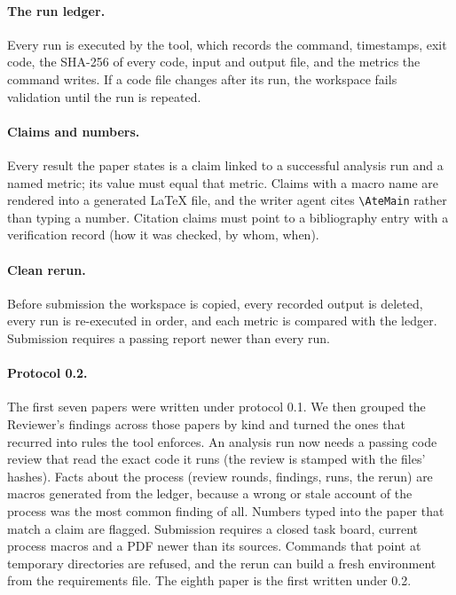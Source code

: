 \documentclass[11pt]{article}
\begin{document}
\paragraph{The run ledger.} Every run is executed by the tool, which records the
command, timestamps, exit code, the SHA-256 of every code, input and output file, and
the metrics the command writes. If a code file changes after its run, the workspace
fails validation until the run is repeated.

\paragraph{Claims and numbers.} Every result the paper states is a claim linked to a
successful analysis run and a named metric; its value must equal that metric. Claims
with a macro name are rendered into a generated \LaTeX{} file, and the writer agent
cites \verb|\AteMain| rather than typing a number. Citation claims must point to a
bibliography entry with a verification record (how it was checked, by whom, when).

\paragraph{Clean rerun.} Before submission the workspace is copied, every recorded
output is deleted, every run is re-executed in order, and each metric is compared with
the ledger. Submission requires a passing report newer than every run.

\paragraph{Protocol 0.2.} The first seven papers were written under protocol 0.1. We then
grouped the Reviewer's findings across those papers by kind and turned the ones that
recurred into rules the tool enforces. An analysis run now needs a passing code review
that read the exact code it runs (the review is stamped with the files' hashes). Facts
about the process (review rounds, findings, runs, the rerun) are macros generated from
the ledger, because a wrong or stale account of the process was the most common finding
of all. Numbers typed into the paper that match a claim are flagged. Submission requires
a closed task board, current process macros and a PDF newer than its sources. Commands
that point at temporary directories are refused, and the rerun can build a fresh
environment from the requirements file. The eighth paper is the first written under 0.2.
\end{document}
